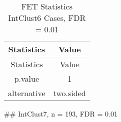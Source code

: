 \documentclass[]{article}
\begin{document}
\begin{longtable}[]{@{}cc@{}}
\caption{FET Statistics IntClust6 Cases, FDR = 0.01}\tabularnewline
\toprule
\begin{minipage}[b]{0.18\columnwidth}\centering\strut
Statistics\strut
\end{minipage} & \begin{minipage}[b]{0.14\columnwidth}\centering\strut
Value\strut
\end{minipage}\tabularnewline
\midrule
\endfirsthead
\toprule
\begin{minipage}[b]{0.18\columnwidth}\centering\strut
Statistics\strut
\end{minipage} & \begin{minipage}[b]{0.14\columnwidth}\centering\strut
Value\strut
\end{minipage}\tabularnewline
\midrule
\endhead
\begin{minipage}[t]{0.18\columnwidth}\centering\strut
p.value\strut
\end{minipage} & \begin{minipage}[t]{0.14\columnwidth}\centering\strut
1\strut
\end{minipage}\tabularnewline
\begin{minipage}[t]{0.18\columnwidth}\centering\strut
alternative\strut
\end{minipage} & \begin{minipage}[t]{0.14\columnwidth}\centering\strut
two.sided\strut
\end{minipage}\tabularnewline
\bottomrule
\end{longtable}

\pagebreak
\#\# IntClust7, n = 193, FDR = 0.01
\end{document}
